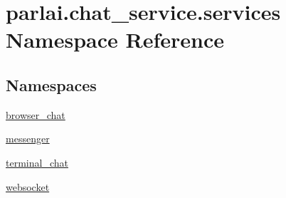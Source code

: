 \hypertarget{namespaceparlai_1_1chat__service_1_1services}{}\section{parlai.\+chat\+\_\+service.\+services Namespace Reference}
\label{namespaceparlai_1_1chat__service_1_1services}
\subsection*{Namespaces}
\begin{DoxyCompactItemize}
\item 
 \hyperlink{namespaceparlai_1_1chat__service_1_1services_1_1browser__chat}{browser\+\_\+chat}
\item 
 \hyperlink{namespaceparlai_1_1chat__service_1_1services_1_1messenger}{messenger}
\item 
 \hyperlink{namespaceparlai_1_1chat__service_1_1services_1_1terminal__chat}{terminal\+\_\+chat}
\item 
 \hyperlink{namespaceparlai_1_1chat__service_1_1services_1_1websocket}{websocket}
\end{DoxyCompactItemize}
